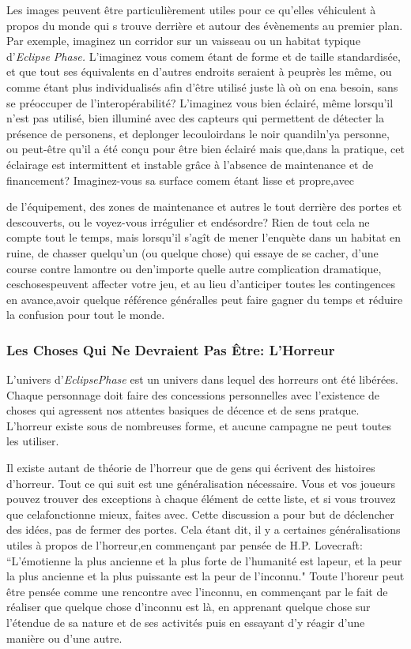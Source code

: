 Les images peuvent être particulièrement utiles pour ce qu'elles véhiculent à propos du monde qui s trouve derrière et autour des évènements au premier plan. Par exemple, imaginez un corridor sur un vaisseau ou un habitat typique d'\textit{Eclipse Phase. } L'imaginez vous comem étant de forme et de taille standardisée, et que tout ses équivalents en d'autres endroits seraient à peuprès les même, ou comme étant plus individualisés afin d'être utilisé juste là où on ena besoin, sans se préoccuper de l'interopérabilité? L'imaginez vous bien éclairé, même lorsqu'il n'est pas utilisé, bien illuminé avec des capteurs qui permettent de détecter la présence de personens, et deplonger lecouloirdans le noir quandiln'ya personne, ou peut-être qu'il a été conçu pour être bien éclairé mais que,dans la pratique, cet éclairage est intermittent et instable grâce à l'absence de maintenance et de financement? Imaginez-vous sa surface comem étant lisse et propre,avec 

de l'équipement, des zones de maintenance et autres le tout derrière des portes et descouverts, ou le voyez-vous irrégulier et endésordre? Rien de tout cela ne compte tout le temps, mais lorsqu'il s'agît de mener l'enquète dans un habitat en ruine, de chasser quelqu'un (ou quelque chose) qui essaye de se cacher, d'une course contre lamontre ou den'importe quelle autre complication dramatique, ceschosespeuvent affecter votre jeu, et au lieu d'anticiper toutes les contingences en avance,avoir quelque référence généralles peut faire gagner du temps et réduire la confusion pour tout le monde. 

\subsubsection{Les Choses Qui Ne Devraient Pas Être: L'Horreur} 

L'univers d'\textit{EclipsePhase} est un univers dans lequel des horreurs ont été libérées. Chaque personnage doit faire des concessions personnelles avec l'existence de choses qui agressent nos attentes basiques de décence et de sens pratque. L'horreur existe sous de nombreuses forme, et aucune campagne ne peut toutes les utiliser. 

Il existe autant de théorie de l'horreur que de gens qui écrivent des histoires d'horreur. Tout ce qui suit est une généralisation nécessaire. Vous et vos joueurs pouvez trouver des exceptions à chaque élément de cette liste, et si vous trouvez que celafonctionne mieux, faites avec. Cette discussion a pour but de déclencher des idées, pas de fermer des portes. Cela étant dit, il y a certaines généralisations utiles à propos de l'horreur,en commençant par pensée de H.P. Lovecraft: ``L'émotienne la plus ancienne et la plus forte de l'humanité est lapeur, et la peur la plus ancienne et la plus puissante est la peur de l'inconnu." Toute l'horeur peut être pensée comme une rencontre avec l'inconnu, en commençant par le fait de réaliser que quelque chose d'inconnu est là, en apprenant quelque chose sur l'étendue de sa nature et de ses activités puis en essayant d'y réagir d'une manière ou d'une autre. 

